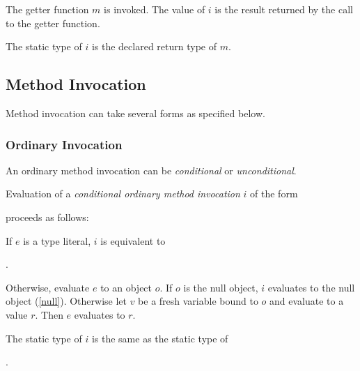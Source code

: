 \documentclass{article}
\begin{document}
\LMHash{}
The getter function $m$ is invoked.
The value of $i$ is the result returned by the call to the getter function.

\LMHash{}
The static type of $i$ is the declared return type of $m$.


\subsection{Method Invocation}

\LMHash{}
Method invocation can take several forms as specified below.


\subsubsection{Ordinary Invocation}


\LMHash{}
An ordinary method invocation can be {\em conditional} or {\em unconditional}.

\LMHash{}
Evaluation of a {\em conditional ordinary method invocation} $i$ of the form


\noindent
proceeds as follows:

\LMHash{}
If $e$ is a type literal, $i$ is equivalent to

.

\LMHash{}
Otherwise, evaluate $e$ to an object $o$.
If $o$ is the null object, $i$ evaluates to the null object (\ref{null}).
Otherwise let $v$ be a fresh variable bound to $o$ and evaluate
to a value $r$.
Then $e$ evaluates to $r$.

\LMHash{}
The static type of $i$ is the same as the static type of

.
\end{document}
